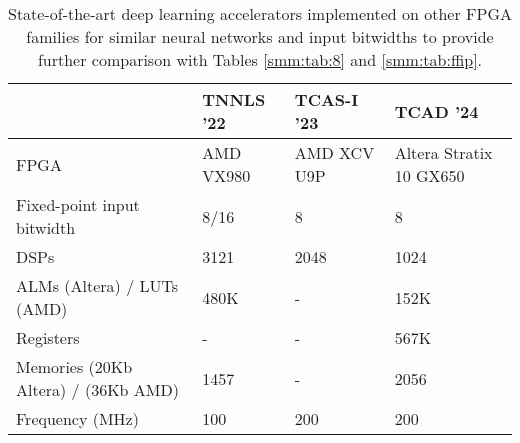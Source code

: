 \begin{table}[]\centering
\caption{State-of-the-art deep learning accelerators implemented on other FPGA families for similar neural networks and input bitwidths to provide further comparison with Tables \ref{smm:tab:8} and \ref{smm:tab:ffip}.}
\label{smm:tab-mixed}
\scriptsize
\begin{threeparttable}
  \begin{tabular}{|>{\raggedleft}p{2.5cm}|V|V|W|}\toprule
                                          &TNNLS '22 \cite{huang2022fpga} &TCAS-I '23 \cite{kim2023agamotto} &TCAD '24 \cite{dai2024dcp} \\
\toprule
FPGA                                       &AMD VX980                         &AMD XCV U9P                            &Altera Stratix 10 GX650                                              \\
\midrule
{}
Fixed-point input bitwidth                 &8/16                 &8                                  &8                                                     \\
\midrule
{}
DSPs                                       &3121                          &2048                               &1024                                                  \\
\midrule
{}
ALMs (Altera) / LUTs (AMD)                 &480K                          &-                                  &152K                                                  \\
\midrule
{}
Registers                                  &-                             &-                                  &567K                                                     \\
\midrule
{}
Memories  (20Kb Altera) / (36Kb AMD)    &1457                          &-                                     &2056                                                  \\
\midrule
{}
Frequency (MHz)                            &100                           &200                                &200                                                   \\

\end{tabular}
\end{threeparttable}
\end{table}
